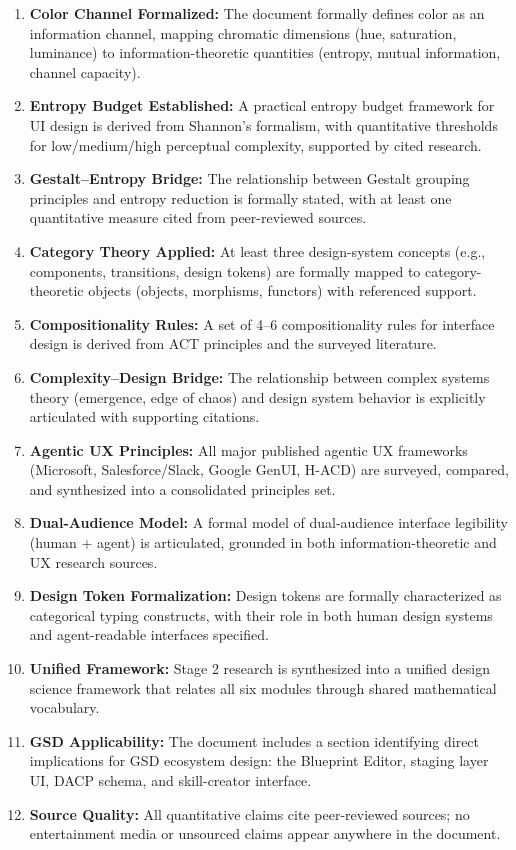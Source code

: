 \documentclass[11pt,letterpaper]{article}
\begin{document}
\begin{enumerate}[leftmargin=2em, itemsep=0.5em]
  \item \textbf{Color Channel Formalized:} The document formally defines color as an information channel, mapping chromatic dimensions (hue, saturation, luminance) to information-theoretic quantities (entropy, mutual information, channel capacity).
  \item \textbf{Entropy Budget Established:} A practical entropy budget framework for UI design is derived from Shannon's formalism, with quantitative thresholds for low/medium/high perceptual complexity, supported by cited research.
  \item \textbf{Gestalt--Entropy Bridge:} The relationship between Gestalt grouping principles and entropy reduction is formally stated, with at least one quantitative measure cited from peer-reviewed sources.
  \item \textbf{Category Theory Applied:} At least three design-system concepts (e.g., components, transitions, design tokens) are formally mapped to category-theoretic objects (objects, morphisms, functors) with referenced support.
  \item \textbf{Compositionality Rules:} A set of 4--6 compositionality rules for interface design is derived from ACT principles and the surveyed literature.
  \item \textbf{Complexity--Design Bridge:} The relationship between complex systems theory (emergence, edge of chaos) and design system behavior is explicitly articulated with supporting citations.
  \item \textbf{Agentic UX Principles:} All major published agentic UX frameworks (Microsoft, Salesforce/Slack, Google GenUI, H-ACD) are surveyed, compared, and synthesized into a consolidated principles set.
  \item \textbf{Dual-Audience Model:} A formal model of dual-audience interface legibility (human + agent) is articulated, grounded in both information-theoretic and UX research sources.
  \item \textbf{Design Token Formalization:} Design tokens are formally characterized as categorical typing constructs, with their role in both human design systems and agent-readable interfaces specified.
  \item \textbf{Unified Framework:} Stage 2 research is synthesized into a unified design science framework that relates all six modules through shared mathematical vocabulary.
  \item \textbf{GSD Applicability:} The document includes a section identifying direct implications for GSD ecosystem design: the Blueprint Editor, staging layer UI, DACP schema, and skill-creator interface.
  \item \textbf{Source Quality:} All quantitative claims cite peer-reviewed sources; no entertainment media or unsourced claims appear anywhere in the document.
\end{enumerate}
\end{document}
